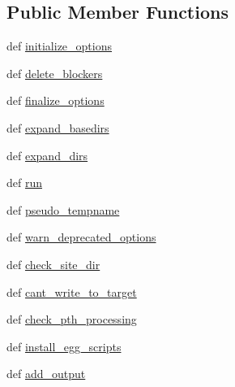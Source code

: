 \subsection*{Public Member Functions}
\begin{DoxyCompactItemize}
\item 
def \hyperlink{classsetuptools_1_1command_1_1easy__install_1_1easy__install_a067b767e4c56b6111dc013a147abb485}{initialize\+\_\+options}
\item 
def \hyperlink{classsetuptools_1_1command_1_1easy__install_1_1easy__install_a6dffdadd2a4a25c0d1f7bb711dcf8aeb}{delete\+\_\+blockers}
\item 
def \hyperlink{classsetuptools_1_1command_1_1easy__install_1_1easy__install_a17fcf3f314ebc2644b46e6edff0fafd2}{finalize\+\_\+options}
\item 
def \hyperlink{classsetuptools_1_1command_1_1easy__install_1_1easy__install_a3cc6b6d0c251050e7642f4d38c2e7d36}{expand\+\_\+basedirs}
\item 
def \hyperlink{classsetuptools_1_1command_1_1easy__install_1_1easy__install_a9cf8d068a4d405a6601d8b4825069582}{expand\+\_\+dirs}
\item 
def \hyperlink{classsetuptools_1_1command_1_1easy__install_1_1easy__install_a88277083983bfde100fd1895ea0012d6}{run}
\item 
def \hyperlink{classsetuptools_1_1command_1_1easy__install_1_1easy__install_a25388b2079a3a96d8bf3ac9b3157b608}{pseudo\+\_\+tempname}
\item 
def \hyperlink{classsetuptools_1_1command_1_1easy__install_1_1easy__install_a52959dc334419901551e1727ed2ba734}{warn\+\_\+deprecated\+\_\+options}
\item 
def \hyperlink{classsetuptools_1_1command_1_1easy__install_1_1easy__install_a54c3d348ac8b2814f480ff6742a3a930}{check\+\_\+site\+\_\+dir}
\item 
def \hyperlink{classsetuptools_1_1command_1_1easy__install_1_1easy__install_a5f1de8d438e8a57bc6d7dca75cf07241}{cant\+\_\+write\+\_\+to\+\_\+target}
\item 
def \hyperlink{classsetuptools_1_1command_1_1easy__install_1_1easy__install_acd0224633edac16866bfab8bac697252}{check\+\_\+pth\+\_\+processing}
\item 
def \hyperlink{classsetuptools_1_1command_1_1easy__install_1_1easy__install_a4c293e5a81e1c41c98ba88e0b447b0c0}{install\+\_\+egg\+\_\+scripts}
\item 
def \hyperlink{classsetuptools_1_1command_1_1easy__install_1_1easy__install_aba44956ee6f935a48ff8bc547eac9973}{add\+\_\+output}

\end{DoxyCompactItemize}
